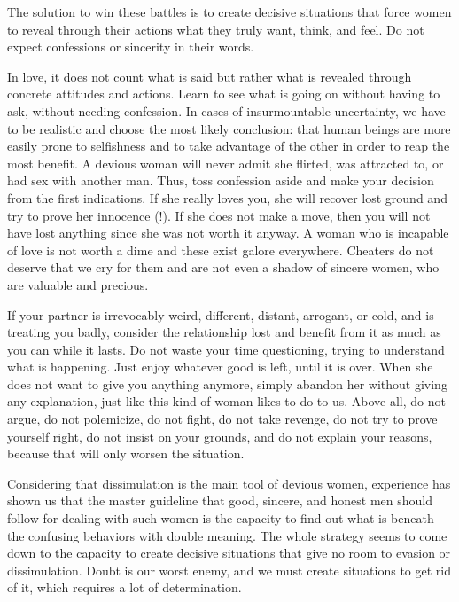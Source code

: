 \par The solution to win these battles is to create decisive situations that force women to reveal through their actions what they truly want, think, and feel. Do not expect confessions or sincerity in their words.

\par In love, it does not count what is said but rather what is revealed through concrete attitudes and actions. Learn to see what is going on without having to ask, without needing confession. In cases of insurmountable uncertainty, we have to be realistic and choose the most likely conclusion: that human beings are more easily prone to selfishness and to take advantage of the other in order to reap the most benefit. A devious woman will never admit she flirted, was attracted to, or had sex with another man. Thus, toss confession aside and make your decision from the first indications. If she really loves you, she will recover lost ground and try to prove her innocence (!). If she does not make a move, then you will not have lost anything since she was not worth it anyway. A woman who is incapable of love is not worth a dime and these exist galore everywhere. Cheaters do not deserve that we cry for them and are not even a shadow of sincere women, who are valuable and precious.

\par If your partner is irrevocably weird, different, distant, arrogant, or cold, and is treating you badly, consider the relationship lost and benefit from it as much as you can while it lasts. Do not waste your time questioning, trying to understand what is happening. Just enjoy whatever good is left, until it is over. When she does not want to give you anything anymore, simply abandon her without giving any explanation, just like this kind of woman likes to do to us. Above all, do not argue, do not polemicize, do not fight, do not take revenge, do not try to prove yourself right, do not insist on your grounds, and do not explain your reasons, because that will only worsen the situation.

\par Considering that dissimulation is the main tool of devious women, experience has shown us that the master guideline that good, sincere, and honest men should follow for dealing with such women is the capacity to find out what is beneath the confusing behaviors with double meaning. The whole strategy seems to come down to the capacity to create decisive situations that give no room to evasion or dissimulation. Doubt is our worst enemy, and we must create situations to get rid of it, which requires a lot of determination.

